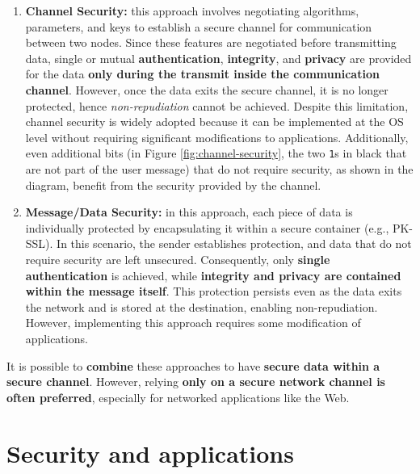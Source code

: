 \begin{enumerate}
    \item \textbf{Channel Security:} this approach involves negotiating algorithms, parameters, and keys to establish a secure channel for communication between two nodes. Since these features are negotiated before transmitting data, single or mutual \textbf{authentication}, \textbf{integrity}, and \textbf{privacy} are provided for the data \textbf{only during the transmit inside the communication channel}. However, once the data exits the secure channel, it is no longer protected, hence \textit{non-repudiation} cannot be achieved. Despite this limitation, channel security is widely adopted because it can be implemented at the OS level without requiring significant modifications to applications.
          Additionally, even additional bits (in Figure \ref*{fig:channel-security}, the two \texttt{1}s in black that are not part of the user message) that do not require security, as shown in the diagram, benefit from the security provided by the channel.

    \item \textbf{Message/Data Security:} in this approach, each piece of data is individually protected by encapsulating it within a secure container (e.g., PK-SSL). In this scenario, the sender establishes protection, and data that do not require security are left unsecured. Consequently, only \textbf{single authentication} is achieved, while \textbf{integrity and privacy are contained within the message itself}. This protection persists even as the data exits the network and is stored at the destination, enabling non-repudiation. However, implementing this approach requires some modification of applications.
\end{enumerate}

It is possible to \textbf{combine} these approaches to have \textbf{secure data within a secure channel}. However, relying \textbf{only on a secure network channel is often preferred}, especially for networked applications like the Web.


\section{Security and applications}


